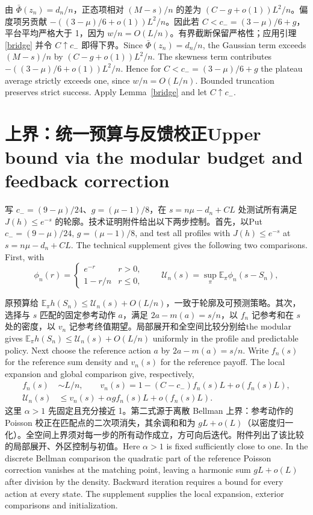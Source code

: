 \documentclass[UTF8,fontset=fandol,11pt]{ctexart}
\newcommand{\bi}[2]{\ifdefined\ResearchPaperChinese #1\else #2\fi}
\begin{document}
\bi{由 $\bar\Phi(z_n)=d_n/n$，正态项相对 $(M-s)/n$ 的差为 $(C-g+o(1))L^2/n$。偏度项另贡献 $-((3-\mu)/6+o(1))L^2/n$。因此若 $C<c_-=(3-\mu)/6+g$，平台平均严格大于 1，因为 $w/n=O(L/n)$。有界截断保留严格性；应用引理 \ref{bridge} 并令 $C\uparrow c_-$ 即得下界。}{Since $\bar\Phi(z_n)=d_n/n$, the Gaussian term exceeds $(M-s)/n$ by $(C-g+o(1))L^2/n$. The skewness term contributes $-((3-\mu)/6+o(1))L^2/n$. Hence for $C<c_-=(3-\mu)/6+g$ the plateau average strictly exceeds one, since $w/n=O(L/n)$. Bounded truncation preserves strict success. Apply Lemma~\ref{bridge} and let $C\uparrow c_-$.}
\section{\bi{上界：统一预算与反馈校正}{Upper bound via the modular budget and feedback correction}}
\bi{写 $c_-=(9-\mu)/24$、$g=(\mu-1)/8$，在 $s=n\mu-d_n+C L$ 处测试所有满足 $J(h)\le e^{-s}$ 的轮廓。技术证明附件给出以下两步控制。首先，以}{Put $c_-=(9-\mu)/24$, $g=(\mu-1)/8$, and test all profiles with $J(h)\le e^{-s}$ at $s=n\mu-d_n+CL$. The technical supplement gives the following two comparisons. First, with}
\[
 \phi_n(r)=\begin{cases}e^{-r}&r>0,\\1-r/n&r\le0,\end{cases}
 \qquad \mathcal U_n(s)=\sup_\pi\mathbb E_\pi\phi_n(s-S_n),
\]

\bi{原预算给 $\mathbb E_\pi h(S_n)\le\mathcal U_n(s)+O(L/n)$，一致于轮廓及可预测策略。其次，选择与 $s$ 匹配的固定参考动作 $a$，满足 $2a-m(a)=s/n$，以 $f_n$ 记参考和在 $s$ 处的密度，以 $v_n$ 记参考终值期望。局部展开和全空间比较分别给}{the modular gives $\mathbb E_\pi h(S_n)\le\mathcal U_n(s)+O(L/n)$ uniformly in the profile and predictable policy. Next choose the reference action $a$ by $2a-m(a)=s/n$. Write $f_n(s)$ for the reference sum density and $v_n(s)$ for the reference payoff. The local expansion and global comparison give, respectively,}
\begin{align*}
 f_n(s)&\sim L/n,\qquad v_n(s)=1-(C-c_-)f_n(s)L+o(f_n(s)L),\\
 \mathcal U_n(s)&\le v_n(s)+\alpha g f_n(s)L+o(f_n(s)L).
\end{align*}
\bi{这里 $\alpha>1$ 先固定且充分接近 1。第二式源于离散 Bellman 上界：参考动作的 Poisson 校正在匹配点的二次项消失，其余调和和为 $gL+o(L)$（以密度归一化）。全空间上界须对每一步的所有动作成立，方可向后迭代。附件列出了该比较的局部展开、外区控制与初值。}{Here $\alpha>1$ is fixed sufficiently close to one. In the discrete Bellman comparison the quadratic part of the reference Poisson correction vanishes at the matching point, leaving a harmonic sum $gL+o(L)$ after division by the density. Backward iteration requires a bound for every action at every state. The supplement supplies the local expansion, exterior comparisons and initialization.}
\end{document}
